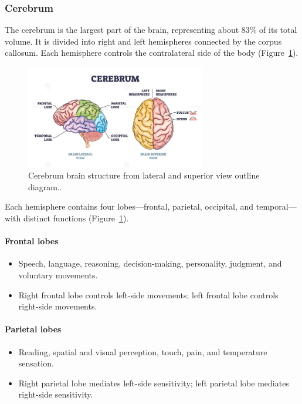 \subsubsection{Cerebrum}
The cerebrum is the largest part of the brain, representing about 83\% of its total volume. It is divided into right and left hemispheres connected by the corpus callosum. Each hemisphere controls the contralateral side of the body (Figure~\ref{fig:cerebrum}).

\begin{figure}[ht]
  \centering
  \includegraphics[width=0.7\textwidth]{Images/Chapter0/cerebrum.jpg}
  \caption{Cerebrum brain structure from lateral and superior view outline diagram.\cite{freudenrich2013visualizing}.}
  \label{fig:cerebrum}
\end{figure}

Each hemisphere contains four lobes—frontal, parietal, occipital, and temporal—with distinct functions (Figure~\ref{fig:cerebrum}).



\paragraph{Frontal lobes}
\begin{itemize}
  \item Speech, language, reasoning, decision-making, personality, judgment, and voluntary movements.
  \item Right frontal lobe controls left-side movements; left frontal lobe controls right-side movements.
\end{itemize}

\paragraph{Parietal lobes}
\begin{itemize}
  \item Reading, spatial and visual perception, touch, pain, and temperature sensation.
  \item Right parietal lobe mediates left-side sensitivity; left parietal lobe mediates right-side sensitivity.
\end{itemize}

